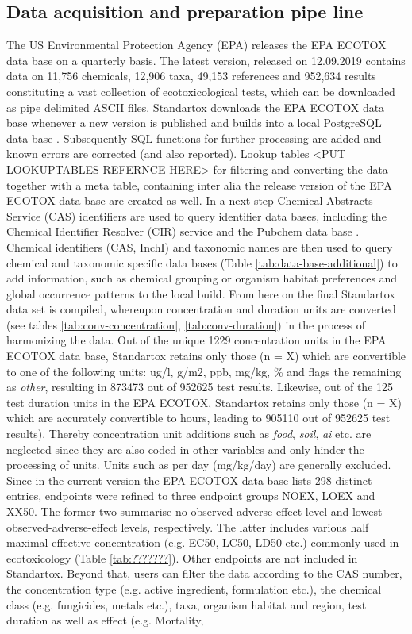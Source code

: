 \subsection*{Data acquisition and preparation pipe line}
The US Environmental Protection Agency (EPA) releases the EPA ECOTOX data base on a quarterly basis. The latest version, released on 12.09.2019 contains data on 11,756 chemicals, 12,906 taxa, 49,153 references and 952,634 results \citep{usepa_ecotox_2019} constituting a vast collection of ecotoxicological tests, which can be downloaded as pipe delimited ASCII files. Standartox downloads the EPA ECOTOX data base whenever a new version is published and builds into a local PostgreSQL data base \citep{szocs_build_2019}. Subsequently SQL functions for further processing are added and known errors are corrected (and also reported). Lookup tables <PUT LOOKUPTABLES REFERNCE HERE> for filtering and converting the data together with a meta table, containing inter alia the release version of the EPA ECOTOX data base are created as well. In a next step Chemical Abstracts Service (CAS) identifiers are used to query identifier data bases, including the Chemical Identifier Resolver (CIR) service \citep{nationalinstitutesofhealthnih_chemical_2019} and the Pubchem data base \citep{kim_pubchem_2016}. Chemical identifiers (CAS, InchI) and taxonomic names are then used to query chemical and taxonomic specific data bases (Table \ref{tab:data-base-additional}) to add information, such as chemical grouping or organism habitat preferences and global occurrence patterns to the local build. From here on the final Standartox data set is compiled, whereupon concentration and duration units are converted (see tables \ref{tab:conv-concentration}, \ref{tab:conv-duration}) in the process of harmonizing the data. Out of the unique 1229 concentration units in the EPA ECOTOX data base, Standartox retains only those (n = X) which are convertible to one of the following units: ug/l, g/m2, ppb, mg/kg, \% and flags the remaining as \textit{other}, resulting in 873473 out of 952625 test results. Likewise, out of the 125 test duration units in the EPA ECOTOX, Standartox retains only those (n = X) which are accurately convertible to hours, leading to 905110 out of 952625 test results). Thereby concentration unit additions such as \textit{food}, \textit{soil}, \textit{ai} etc. are neglected since they are also coded in other variables and only hinder the processing of units. Units such as per day (mg/kg/day) are generally excluded. Since in the current version the EPA ECOTOX data base lists 298 distinct entries, endpoints were refined to three endpoint groups NOEX, LOEX and XX50. The former two summarise no-observed-adverse-effect level and lowest-observed-adverse-effect levels, respectively. The latter includes various half maximal effective concentration (e.g. EC50, LC50, LD50 etc.) commonly used in ecotoxicology (Table \ref{tab:???????}). Other endpoints are not included in Standartox. Beyond that, users can filter the data according to the CAS number, the concentration type (e.g. active ingredient, formulation etc.), the chemical class (e.g. fungicides, metals etc.), taxa, organism habitat and region, test duration as well as effect (e.g. Mortality, 
